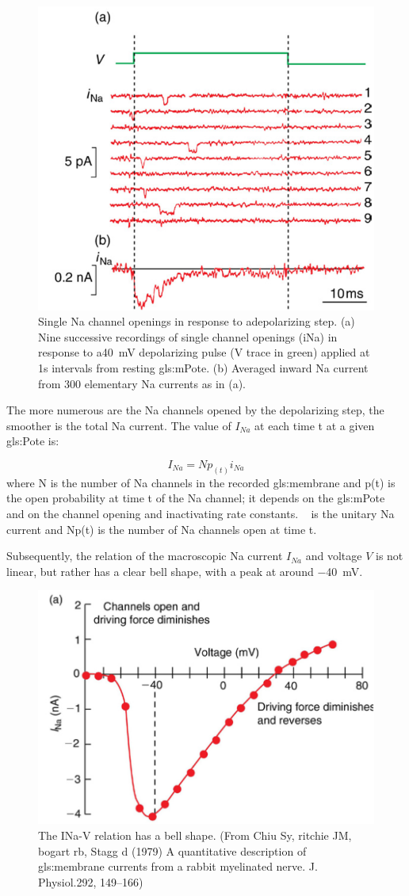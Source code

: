 \documentclass[../../Orator]{subfiles}
\begin{document}
\begin{figure}[H]
    \centering
    \includegraphics[width=0.5\linewidth]{Pictures//Anakin/iNa.png}
    \caption{Single \gls{Na} channel openings in response to adepolarizing step. (a) Nine successive recordings of single channel openings (iNa) in response to a\qty{ 40}{\mV} depolarizing pulse (V trace in green) applied at 1s intervals from resting \gls{gls:mPote}. (b) Averaged inward \gls{Na} current from 300 elementary \gls{Na} currents as in (a).  }
    \label{fig:enter-label}
\end{figure}

The more numerous are the \gls{Na} channels opened by the depolarizing step, the smoother is the total \gls{Na} current. The value of \(I_{Na}\) at each time t at a given \gls{gls:Pote} is: 

\[I_{Na}=N p_{(t)} i_{Na} \]
where N is the number of \gls{Na} channels in the recorded \gls{gls:membrane} and p(t) is the open probability at time t of the \gls{Na} channel; it depends on the \gls{gls:mPote} and on the channel opening and inactivating rate constants. \unit{\cur\sodium} is the unitary \gls{Na} current and Np(t) is the number of \gls{Na} channels open at time t. 

Subsequently, the relation of the macroscopic \gls{Na} current \(I_{Na}\) and voltage \(V\) is not linear, but rather has a clear bell shape, with a peak at around \qty{-40}{\mV}. 
\begin{figure}[H]
    \centering
    \includegraphics[width=0.5\linewidth]{Pictures//Anakin/I-V.bell.png}
    \caption{The INa-V relation has a bell shape. (From Chiu Sy, ritchie JM, bogart rb, Stagg d (1979) A quantitative description of \gls{gls:membrane} currents from a rabbit myelinated nerve. J. Physiol.292, 149–166)}
    \label{fig:enter-label}
\end{figure}
 
\end{document}
